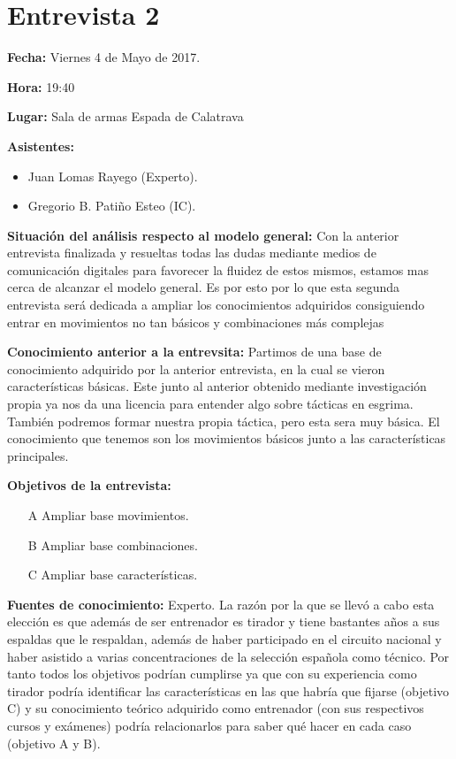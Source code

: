 \section{Entrevista 2}

\textbf{Fecha:} Viernes 4 de Mayo de 2017.

\textbf{Hora:} 19:40

\textbf{Lugar:} Sala de armas Espada de Calatrava

\textbf{Asistentes:}
  \begin{itemize}
    \item Juan Lomas Rayego (Experto).
    \item Gregorio B. Patiño Esteo (IC).
  \end{itemize}

\textbf{Situación del análisis respecto al modelo general:} Con la anterior entrevista finalizada
y resueltas todas las dudas mediante medios de comunicación digitales para favorecer la fluidez
de estos mismos, estamos mas cerca de alcanzar el modelo general. Es por esto por lo que esta segunda
entrevista será dedicada a ampliar los conocimientos adquiridos consiguiendo entrar en movimientos
no tan básicos y combinaciones más complejas

\textbf{Conocimiento anterior a la entrevsita:} Partimos de una base de conocimiento adquirido
por la anterior entrevista, en la cual se vieron características básicas. Este junto al anterior
obtenido mediante investigación propia ya nos da una licencia para entender algo sobre tácticas
en esgrima. También podremos formar nuestra propia táctica, pero esta sera muy básica. El conocimiento
que tenemos son los movimientos básicos junto a las características principales.

\textbf{Objetivos de la entrevista:}
  \begin{itemize}
    \item[A] Ampliar base movimientos.
    \item[B] Ampliar base combinaciones.
    \item[C] Ampliar base características.
  \end{itemize}

\textbf{Fuentes de conocimiento:} Experto.
La razón por la que se llevó a cabo esta elección es que además de ser entrenador es tirador y
tiene bastantes años a sus espaldas que le respaldan, además de haber participado en el circuito
nacional y haber asistido a varias concentraciones de la selección española como técnico. Por
tanto todos los objetivos podrían cumplirse ya que con su experiencia como tirador podría
identificar las características en las que habría que fijarse (objetivo C) y su conocimiento teórico
adquirido como entrenador (con sus respectivos cursos y exámenes) podría relacionarlos para
saber qué hacer en cada caso (objetivo A y B).

